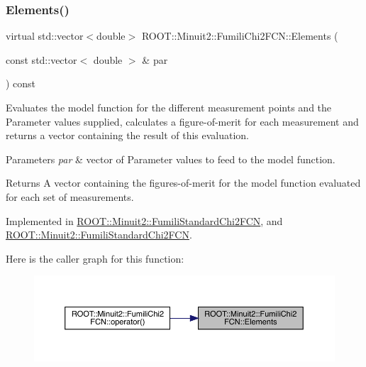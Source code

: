 \subsubsection{\texorpdfstring{Elements()}{Elements()}\hspace{0.1cm}{\footnotesize\ttfamily [1/2]}}
{\footnotesize\ttfamily virtual std\+::vector$<$double$>$ R\+O\+O\+T\+::\+Minuit2\+::\+Fumili\+Chi2\+F\+C\+N\+::\+Elements (\begin{DoxyParamCaption}\item[{const std\+::vector$<$ double $>$ \&}]{par }\end{DoxyParamCaption}) const\hspace{0.3cm}{\ttfamily [pure virtual]}}

Evaluates the model function for the different measurement points and the Parameter values supplied, calculates a figure-\/of-\/merit for each measurement and returns a vector containing the result of this evaluation.


\begin{DoxyParams}{Parameters}
{\em par} & vector of Parameter values to feed to the model function.\\
\hline
\end{DoxyParams}
\begin{DoxyReturn}{Returns}
A vector containing the figures-\/of-\/merit for the model function evaluated for each set of measurements. 
\end{DoxyReturn}


Implemented in \mbox{\hyperlink{classROOT_1_1Minuit2_1_1FumiliStandardChi2FCN_ae7683cdbfa4160902add963d2132ab76}{R\+O\+O\+T\+::\+Minuit2\+::\+Fumili\+Standard\+Chi2\+F\+CN}}, and \mbox{\hyperlink{classROOT_1_1Minuit2_1_1FumiliStandardChi2FCN_ab05d3fe2dcb9b1c56b6753debe5e0064}{R\+O\+O\+T\+::\+Minuit2\+::\+Fumili\+Standard\+Chi2\+F\+CN}}.

Here is the caller graph for this function\+:\nopagebreak
\begin{figure}[H]
\begin{center}
\leavevmode
\includegraphics[width=350pt]{d3/df0/classROOT_1_1Minuit2_1_1FumiliChi2FCN_a25cc8dcc2eff831b3c0a94bf5413c2cd_icgraph}
\end{center}
\end{figure}
\mbox{\label{classROOT_1_1Minuit2_1_1FumiliChi2FCN_a25cc8dcc2eff831b3c0a94bf5413c2cd}} 
